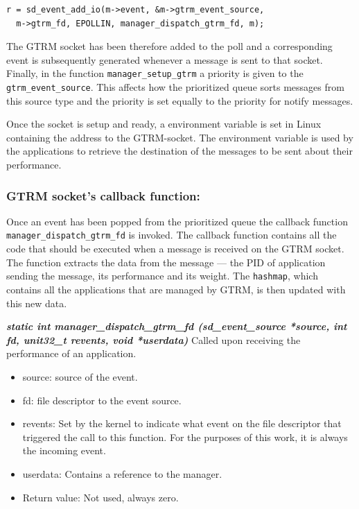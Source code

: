 \documentclass[nobiblatex]{LTHthesis}
\begin{document}
\begin{verbatim}
r = sd_event_add_io(m->event, &m->gtrm_event_source, 
  m->gtrm_fd, EPOLLIN, manager_dispatch_gtrm_fd, m);
\end{verbatim}

The GTRM socket has been therefore added to the poll and a corresponding 
event is subsequently generated whenever a message is sent to that socket. 
Finally, in the function \texttt{manager\_setup\_gtrm} a priority is given
to the \texttt{gtrm\_event\_source}. This affects how the prioritized 
queue sorts messages from this source type and the priority is set equally
to the priority for notify messages.

Once the socket is setup and ready, a environment variable is set in 
Linux containing the address to the GTRM-socket. The environment variable is
used by the applications to retrieve the destination of the messages to be
sent about their performance.

\subsubsection{GTRM socket's callback function:}
Once an event has been popped from the prioritized queue the callback 
function \texttt{manager\_dispatch\_gtrm\_fd} is invoked. 
The callback function contains all the code that should be executed when a
message is received on the GTRM socket. The function extracts the data 
from the message --- the PID of application sending the message, its
performance and its weight. The \texttt{hashmap}, which contains all the
applications that are managed by GTRM, is then updated with this new data. 

\begin{framed}
	\begin{flushleft}
		\textbf{\emph{static int manager\_dispatch\_gtrm\_fd \newline
      (sd\_event\_source *source, int fd, unit32\_t revents, void *userdata)}} \newline 
			Called upon receiving the performance of an application.
			\begin{itemize}
			\item source: source of the event.
			\item fd: file descriptor to the event source.
			\item revents: Set by the kernel to indicate what event on the file
        descriptor that triggered the call to this function. For the purposes
        of this work, it is always the incoming event.
			\item userdata: Contains a reference to the manager.
			\item Return value: Not used, always zero.
			\end{itemize}
	\end{flushleft}	
\end{framed}
\end{document}
